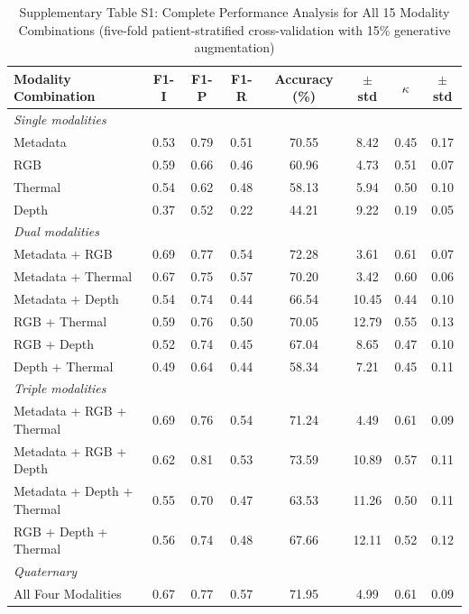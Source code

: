 
\begin{table}[!t]
\renewcommand{\arraystretch}{1.2}
\caption{Supplementary Table S1: Complete Performance Analysis for All 15 Modality Combinations (five-fold patient-stratified cross-validation with 15\% generative augmentation)}
\label{tab:supplementary_all_combos}
\centering
\begin{tabular}{|l|c|c|c|c|c|c|c|}
\hline
\textbf{Modality Combination} & \textbf{F1-I} & \textbf{F1-P} & \textbf{F1-R} & \textbf{Accuracy (\%)} & \textbf{$\pm$std} & \textbf{$\kappa$} & \textbf{$\pm$std} \\
\hline
\multicolumn{8}{|l|}{\textit{Single modalities}} \\
\hline
Metadata & 0.53 & 0.79 & 0.51 & 70.55 & 8.42 & 0.45 & 0.17 \\
RGB & 0.59 & 0.66 & 0.46 & 60.96 & 4.73 & 0.51 & 0.07 \\
Thermal & 0.54 & 0.62 & 0.48 & 58.13 & 5.94 & 0.50 & 0.10 \\
Depth & 0.37 & 0.52 & 0.22 & 44.21 & 9.22 & 0.19 & 0.05 \\
\hline
\multicolumn{8}{|l|}{\textit{Dual modalities}} \\
\hline
Metadata + RGB & 0.69 & 0.77 & 0.54 & 72.28 & 3.61 & 0.61 & 0.07 \\
Metadata + Thermal & 0.67 & 0.75 & 0.57 & 70.20 & 3.42 & 0.60 & 0.06 \\
Metadata + Depth & 0.54 & 0.74 & 0.44 & 66.54 & 10.45 & 0.44 & 0.10 \\
RGB + Thermal & 0.59 & 0.76 & 0.50 & 70.05 & 12.79 & 0.55 & 0.13 \\
RGB + Depth & 0.52 & 0.74 & 0.45 & 67.04 & 8.65 & 0.47 & 0.10 \\
Depth + Thermal & 0.49 & 0.64 & 0.44 & 58.34 & 7.21 & 0.45 & 0.11 \\
\hline
\multicolumn{8}{|l|}{\textit{Triple modalities}} \\
\hline
Metadata + RGB + Thermal & 0.69 & 0.76 & 0.54 & 71.24 & 4.49 & 0.61 & 0.09 \\
Metadata + RGB + Depth & 0.62 & 0.81 & 0.53 & 73.59 & 10.89 & 0.57 & 0.11 \\
Metadata + Depth + Thermal & 0.55 & 0.70 & 0.47 & 63.53 & 11.26 & 0.50 & 0.11 \\
RGB + Depth + Thermal & 0.56 & 0.74 & 0.48 & 67.66 & 12.11 & 0.52 & 0.12 \\
\hline
\multicolumn{8}{|l|}{\textit{Quaternary}} \\
\hline
All Four Modalities & 0.67 & 0.77 & 0.57 & 71.95 & 4.99 & 0.61 & 0.09 \\
\hline
\end{tabular}
\end{table}
